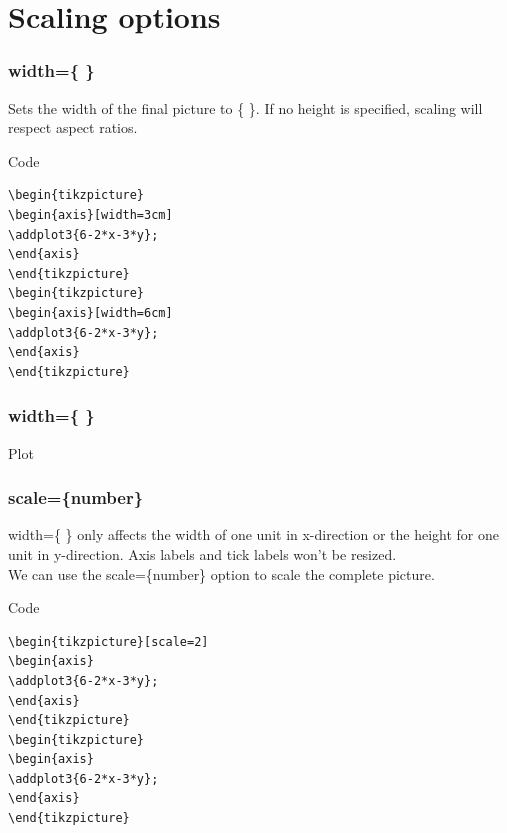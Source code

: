 \documentclass{beamer}
\begin{document}
\section{Scaling options}
\begin{frame}[fragile]
\frametitle{width=\{ \}}
Sets the width of the final picture to \{ \}. If no height is specified, scaling will respect aspect ratios.
\begin{block}{Code}
\begin{verbatim}
\begin{tikzpicture}
\begin{axis}[width=3cm]
\addplot3{6-2*x-3*y};
\end{axis}
\end{tikzpicture}
\begin{tikzpicture}
\begin{axis}[width=6cm]
\addplot3{6-2*x-3*y};
\end{axis}
\end{tikzpicture}
\end{verbatim}
\end{block}
\end{frame}
\begin{frame}[fragile]
\frametitle{width=\{ \}}
\begin{block}{Plot}
\end{block}
\end{frame}
\begin{frame}[fragile]
\frametitle{scale=\{number\}}
\color{blue} width=\{ \} \color{black} only affects the width of one unit in x-direction or the height for one unit in y-direction. Axis labels and tick labels won't be resized.\\
We can use the \color{blue} scale=\{\color{black}number\color{blue}\} \color{black} option to scale the complete picture.
\small{
\begin{block}{Code}
\begin{verbatim}
\begin{tikzpicture}[scale=2]
\begin{axis}
\addplot3{6-2*x-3*y};
\end{axis}
\end{tikzpicture}
\begin{tikzpicture}
\begin{axis}
\addplot3{6-2*x-3*y};
\end{axis}
\end{tikzpicture}
\end{verbatim}
\end{block}}
\end{frame}
\end{document}
